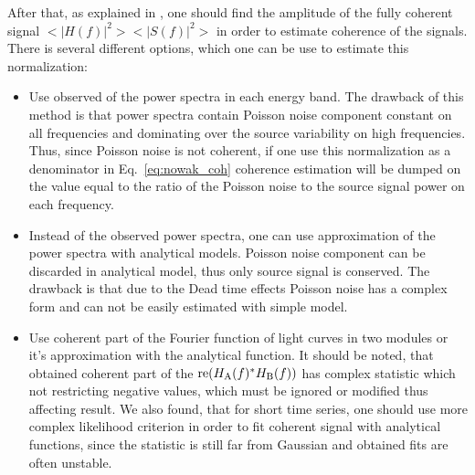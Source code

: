 \documentclass[a4paper,fleqn,usenatbib]{mnras}
\begin{document}
After that, as explained in \citep{Nowak99}, one should find the amplitude of the fully coherent signal $<|H(f)|^2><|S(f)|^2>$ in order to estimate coherence of the signals. 
There is several different options, which one can be use to estimate this normalization:
\begin{itemize}
        \item Use observed of the power spectra in each energy band. 
                The drawback of this method is that power spectra contain Poisson noise component constant on all frequencies and dominating over the source variability on high frequencies. 
                Thus, since Poisson noise is not coherent,  if one use this normalization as a denominator in Eq.~\ref{eq:nowak_coh} coherence estimation will be dumped on the value equal to the ratio of the Poisson noise to the source signal power on each frequency.
        \item Instead of the observed power spectra, one can use approximation of the power spectra with analytical models. 
                Poisson noise component can be discarded in analytical model, thus only source signal is conserved. 
                The drawback is that due to the Dead time effects Poisson noise has a complex form and can not be easily estimated with simple model.
        \item Use coherent part of the Fourier function of light curves in two modules \citep{2015ApJ...800..109B} or it's approximation with the analytical function. 
                It should be noted, that obtained coherent part of the ${\rm re}(H_{\rm A}(f)^*H_{\rm B}(f))$ has complex statistic which not restricting negative values, which must be ignored or modified thus affecting result.  
                We also found, that for short time series, one should use more complex likelihood criterion in order to fit coherent signal with analytical functions, since the statistic is still far from Gaussian and obtained fits are often unstable.
\end{itemize}
\end{document}

